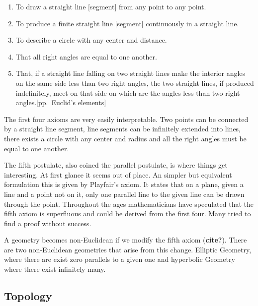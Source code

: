 \begin{enumerate}
\def\labelenumi{\arabic{enumi}.}
\tightlist
\item
  To draw a straight line {[}segment{]} from any point to any point.
\item
  To produce a finite straight line {[}segment{]} continuously in a
  straight line.
\item
  To describe a circle with any center and distance.
\item
  That all right angles are equal to one another.
\item
  That, if a straight line falling on two straight lines make the
  interior angles on the same side less than two right angles, the two
  straight lines, if produced indefinitely, meet on that side on which
  are the angles less than two right angles.{[}pp.~Euclid's elements{]}
\end{enumerate}

The first four axioms are very easily interpretable. Two points can be
connected by a straight line segment, line segments can be infinitely
extended into lines, there exists a circle with any center and radius
and all the right angles must be equal to one another.

The fifth postulate, also coined the parallel postulate, is where things
get interesting. At first glance it seems out of place. An simpler but
equivalent formulation this is given by Playfair's axiom. It states that
on a plane, given a line and a point not on it, only one parallel line
to the given line can be drawn through the point. Throughout the ages
mathematicians have speculated that the fifth axiom is superfluous and
could be derived from the first four. Many tried to find a proof without
success.


A geometry becomes non-Euclidean if we modify the fifth axiom
(\textbf{cite?}). There are two non-Euclidean geometries that arise from
this change. Elliptic Geometry, where there are exist zero parallels to
a given one and hyperbolic Geometry where there exist infinitely many.



\subsection{Topology}\label{topology}


